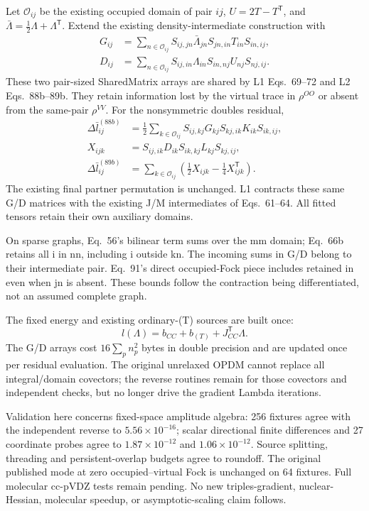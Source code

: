 \documentclass[11pt]{article}
\newcommand{\T}{^{\mathsf T}}
\begin{document}
Let $\mathcal O_{ij}$ be the existing occupied domain of pair $ij$,
$U=2T-T\T$, and $\bar\Lambda=\tfrac12\Lambda+\Lambda\T$.
Extend the existing density-intermediate construction with
\begin{align}
 G_{ij}&=\sum_{n\in\mathcal O_{ij}}
    S_{ij,jn}\bar\Lambda_{jn}S_{jn,in}T_{in}S_{in,ij},\\
 D_{ij}&=\sum_{n\in\mathcal O_{ij}}
    S_{ij,in}\Lambda_{in}S_{in,nj}U_{nj}S_{nj,ij}.
\end{align}
These two pair-sized SharedMatrix arrays are shared by L1 Eqs.~69--72
and L2 Eqs.~88b--89b. They retain information lost by the virtual trace
in $\rho^{OO}$ or absent from the same-pair $\rho^{VV}$.
For the nonsymmetric doubles residual,
\begin{align}
 \Delta\bar l_{ij}^{(88b)}&=\tfrac12\sum_{k\in\mathcal O_{ij}}
    S_{ij,kj}G_{kj}S_{kj,ik}K_{ik}S_{ik,ij},\\
 X_{ijk}&=S_{ij,ik}D_{ik}S_{ik,kj}L_{kj}S_{kj,ij},\\
 \Delta\bar l_{ij}^{(89b)}&=\sum_{k\in\mathcal O_{ij}}
    \left(\tfrac12 X_{ijk}-\tfrac14 X_{ijk}\T\right).
\end{align}
The existing final partner permutation is unchanged. L1 contracts these
same G/D matrices with the existing J/M intermediates of Eqs.~61--64.
All fitted tensors retain their own auxiliary domains.

On sparse graphs, Eq.~56's bilinear term sums over the mm domain;
Eq.~66b retains all i in nn, including i outside kn. The incoming sums
in G/D belong to their intermediate pair. Eq.~91's direct occupied-Fock
piece includes retained in even when jn is absent. These bounds follow
the contraction being differentiated, not an assumed complete graph.

The fixed energy and existing ordinary-(T) sources are built once:
\begin{equation}
 l(\Lambda)=b_{CC}+b_{(T)}+J_{CC}\T\Lambda.
\end{equation}
The G/D arrays cost $16\sum_p n_p^2$ bytes in double precision and are
updated once per residual evaluation. The original unrelaxed OPDM cannot
replace all integral/domain covectors; the reverse routines remain for
those covectors and independent checks, but no longer drive the gradient
Lambda iterations.

Validation here concerns fixed-space amplitude algebra: 256 fixtures
agree with the independent reverse to $5.56\times10^{-16}$; scalar
directional finite differences and 27 coordinate probes agree to
$1.87\times10^{-12}$ and $1.06\times10^{-12}$. Source splitting,
threading and persistent-overlap budgets agree to roundoff. The original
published mode at zero occupied--virtual Fock is unchanged on 64 fixtures.
Full molecular cc-pVDZ tests remain pending. No new triples-gradient,
nuclear-Hessian, molecular speedup, or asymptotic-scaling claim follows.
\end{document}
